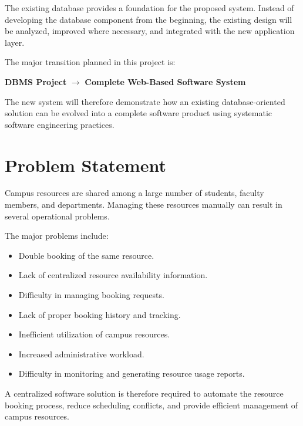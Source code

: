 \documentclass[12pt,a4paper]{article}
\begin{document}
The existing database provides a foundation for the proposed system. Instead of developing the database component from the beginning, the existing design will be analyzed, improved where necessary, and integrated with the new application layer.

The major transition planned in this project is:

\begin{center}
\textbf{DBMS Project}
\quad $\longrightarrow$ \quad
\textbf{Complete Web-Based Software System}
\end{center}

The new system will therefore demonstrate how an existing database-oriented solution can be evolved into a complete software product using systematic software engineering practices.



\section{Problem Statement}

Campus resources are shared among a large number of students, faculty members, and departments. Managing these resources manually can result in several operational problems.

The major problems include:

\begin{itemize}
    \item Double booking of the same resource.
    \item Lack of centralized resource availability information.
    \item Difficulty in managing booking requests.
    \item Lack of proper booking history and tracking.
    \item Inefficient utilization of campus resources.
    \item Increased administrative workload.
    \item Difficulty in monitoring and generating resource usage reports.
\end{itemize}

A centralized software solution is therefore required to automate the resource booking process, reduce scheduling conflicts, and provide efficient management of campus resources.


\end{document}
